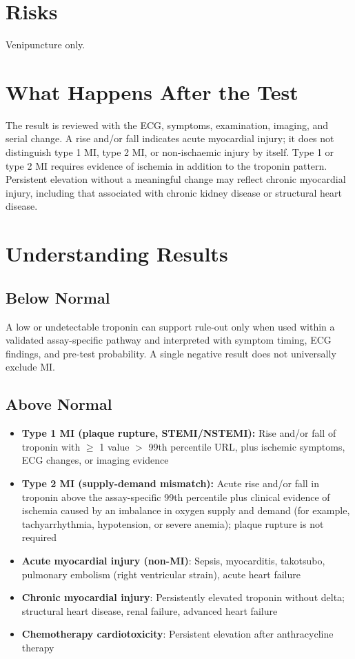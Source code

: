 \section*{Risks}
Venipuncture only.

\section*{What Happens After the Test}
The result is reviewed with the ECG, symptoms, examination, imaging, and serial change. A rise and/or fall indicates acute myocardial injury; it does not distinguish type 1 MI, type 2 MI, or non-ischaemic injury by itself. Type 1 or type 2 MI requires evidence of ischemia in addition to the troponin pattern. Persistent elevation without a meaningful change may reflect chronic myocardial injury, including that associated with chronic kidney disease or structural heart disease.

\section*{Understanding Results}

\subsection*{Below Normal}
A low or undetectable troponin can support rule-out only when used within a validated assay-specific pathway and interpreted with symptom timing, ECG findings, and pre-test probability. A single negative result does not universally exclude MI.

\subsection*{Above Normal}
\begin{itemize}
  \item \textbf{Type 1 MI (plaque rupture, STEMI/NSTEMI):} Rise and/or fall of troponin with $\geq$ 1 value $>$ 99th percentile URL, plus ischemic symptoms, ECG changes, or imaging evidence
  \item \textbf{Type 2 MI (supply-demand mismatch):} Acute rise and/or fall in troponin above the assay-specific 99th percentile plus clinical evidence of ischemia caused by an imbalance in oxygen supply and demand (for example, tachyarrhythmia, hypotension, or severe anemia); plaque rupture is not required
  \item \textbf{Acute myocardial injury (non-MI)}: Sepsis, myocarditis, takotsubo, pulmonary embolism (right ventricular strain), acute heart failure
  \item \textbf{Chronic myocardial injury}: Persistently elevated troponin without delta; structural heart disease, renal failure, advanced heart failure
  \item \textbf{Chemotherapy cardiotoxicity}: Persistent elevation after anthracycline therapy
\end{itemize}

